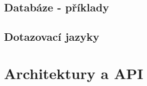 \subsection{Databáze - příklady}
\label{sec:gdb-databaze}









\subsection{Dotazovací jazyky}






 



\section{Architektury a API} %






